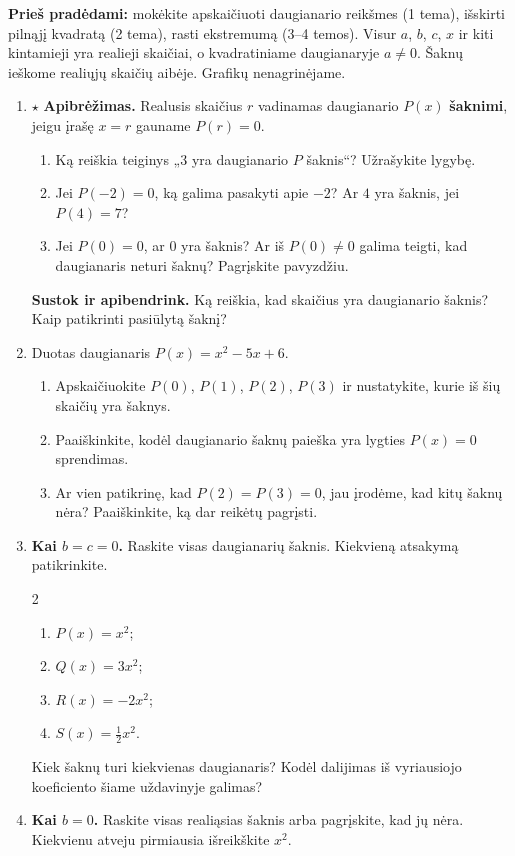 \documentclass[12pt,a4paper]{article}
\begin{document}
\textbf{Prieš pradėdami:} mokėkite apskaičiuoti daugianario reikšmes (1 tema), išskirti pilnąjį kvadratą (2 tema), rasti ekstremumą (3–4 temos). Visur $a$, $b$, $c$, $x$ ir kiti kintamieji yra realieji skaičiai, o kvadratiniame daugianaryje $a\ne0$. Šaknų ieškome realiųjų skaičių aibėje. Grafikų nenagrinėjame.
\begin{enumerate}
\item $\star$ \textbf{Apibrėžimas.} Realusis skaičius $r$ vadinamas daugianario $P(x)$ \textbf{šaknimi}, jeigu įrašę $x=r$ gauname $P(r)=0$.
\begin{enumerate}
\item Ką reiškia teiginys „$3$ yra daugianario $P$ šaknis“? Užrašykite lygybę.
\item Jei $P(-2)=0$, ką galima pasakyti apie $-2$? Ar $4$ yra šaknis, jei $P(4)=7$?
\item Jei $P(0)=0$, ar $0$ yra šaknis? Ar iš $P(0)\ne0$ galima teigti, kad daugianaris neturi šaknų? Pagrįskite pavyzdžiu.
\end{enumerate}
\par\medskip
\textbf{Sustok ir apibendrink.} Ką reiškia, kad skaičius yra daugianario šaknis? Kaip patikrinti pasiūlytą šaknį?
\item Duotas daugianaris $P(x)=x^2-5x+6$.
\begin{enumerate}
\item Apskaičiuokite $P(0)$, $P(1)$, $P(2)$, $P(3)$ ir nustatykite, kurie iš šių skaičių yra šaknys.
\item Paaiškinkite, kodėl daugianario šaknų paieška yra lygties $P(x)=0$ sprendimas.
\item Ar vien patikrinę, kad $P(2)=P(3)=0$, jau įrodėme, kad kitų šaknų nėra? Paaiškinkite, ką dar reikėtų pagrįsti.
\end{enumerate}
\item \textbf{Kai $b=c=0$.} Raskite visas daugianarių šaknis. Kiekvieną atsakymą patikrinkite.
\begin{multicols}{2}\begin{enumerate}
\item $P(x)=x^2$; \item $Q(x)=3x^2$; \item $R(x)=-2x^2$; \item $S(x)=\frac{1}{2}x^2$.
\end{enumerate}\end{multicols}
Kiek šaknų turi kiekvienas daugianaris? Kodėl dalijimas iš vyriausiojo koeficiento šiame uždavinyje galimas?
\needspace{4cm}
\item \textbf{Kai $b=0$.} Raskite visas realiąsias šaknis arba pagrįskite, kad jų nėra. Kiekvienu atveju pirmiausia išreikškite $x^2$.

\end{enumerate}
\end{document}
